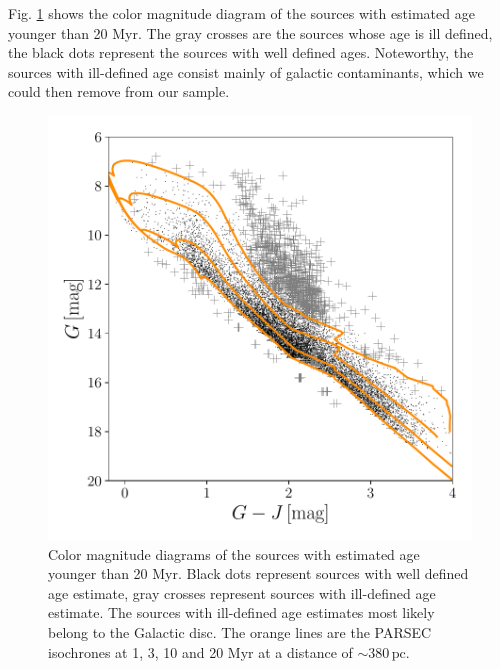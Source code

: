 \documentclass[onecolumn]{aa} %
\begin{document}
Fig. \ref{fig:6a} shows the color magnitude diagram of the sources with estimated age younger than 20 Myr. The gray crosses are the sources whose age is ill defined, the black dots represent the sources with well defined ages.
Noteworthy, the sources with ill-defined age consist mainly of galactic contaminants, which we could then remove from our sample.
\begin{figure}
\includegraphics[width = \hsize]{fig10.pdf}
\caption{Color magnitude diagrams of the sources with estimated age younger than 20 Myr. Black dots represent sources with well defined age estimate, gray crosses represent sources with ill-defined age estimate. The sources with ill-defined age estimates most likely belong to the Galactic disc.
The orange lines are the PARSEC isochrones at 1, 3, 10 and 20 Myr at a distance of $\sim 380 \,\mathrm{pc}$. 
}
\label{fig:6a}
\end{figure}
\end{document}
